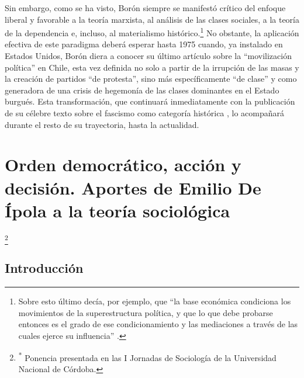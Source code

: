 Sin embargo, como se ha visto, Borón siempre se manifestó crítico del enfoque liberal y favorable a la teoría marxista, al análisis de las clases sociales, a la teoría de la dependencia e, incluso, al materialismo histórico.\footnote{Sobre esto último decía, por ejemplo, que \enquote{la base económica condiciona los movimientos de la superestructura política, y que lo que debe probarse entonces es el grado de ese condicionamiento y las mediaciones a través de las cuales ejerce su influencia} \parencite[228]{1573-BORON1972}.} No obstante, la aplicación efectiva de este paradigma deberá esperar hasta 1975 cuando, ya instalado en Estados Unidos, Borón diera a conocer su último artículo sobre la \enquote{movilización política} en Chile, esta vez definida no solo a partir de la irrupción de las masas y la creación de partidos \enquote{de protesta}, sino más específicamente \enquote{de clase} y como generadora de una crisis de hegemonía de las clases dominantes en el Estado burgués. Esta transformación, que continuará inmediatamente con la publicación de su célebre texto sobre el fascismo como categoría histórica \parencite{1575-BORON1977}, lo acompañará durante el resto de su trayectoria, hasta la actualidad.

\chapter{Orden democrático, acción y decisión. Aportes de Emilio De Ípola a la teoría sociológica}

\footnote{\textsuperscript{*} Ponencia presentada en las I Jornadas de Sociología de la Universidad Nacional de Córdoba.}

\section{Introducción}

